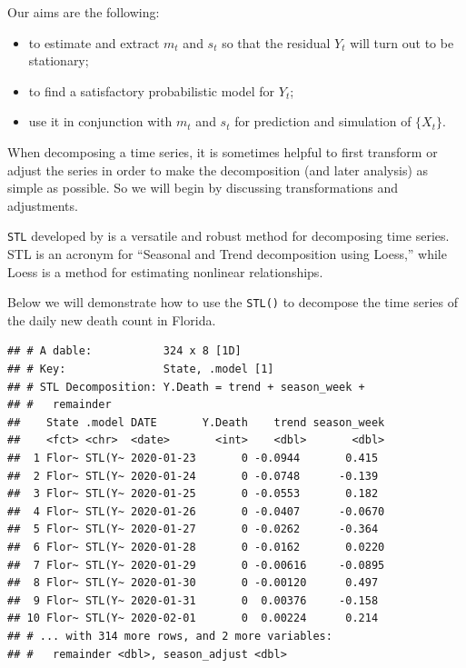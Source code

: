 \documentclass[]{book}
\newenvironment{Shaded}{\begin{snugshade}}{\end{snugshade}}
\newcommand{\KeywordTok}[1]{\textcolor[rgb]{0.13,0.29,0.53}{\textbf{#1}}}
\newcommand{\StringTok}[1]{\textcolor[rgb]{0.31,0.60,0.02}{#1}}
\newcommand{\CommentTok}[1]{\textcolor[rgb]{0.56,0.35,0.01}{\textit{#1}}}
\newcommand{\OperatorTok}[1]{\textcolor[rgb]{0.81,0.36,0.00}{\textbf{#1}}}
\newcommand{\NormalTok}[1]{#1}
\providecommand{\tightlist}{%
  \setlength{\itemsep}{0pt}\setlength{\parskip}{0pt}}
\begin{document}
Our aims are the following:

\begin{itemize}
\tightlist
\item
  to estimate and extract \(m_t\) and \(s_t\) so that the residual
  \(Y_t\) will turn out to be stationary;
\item
  to find a satisfactory probabilistic model for \(Y_t\);
\item
  use it in conjunction with \(m_t\) and \(s_t\) for prediction and
  simulation of \(\{X_t\}\).
\end{itemize}

When decomposing a time series, it is sometimes helpful to first
transform or adjust the series in order to make the decomposition (and
later analysis) as simple as possible. So we will begin by discussing
transformations and adjustments.

\texttt{STL} developed by \citet{Cleveland1990} is a versatile and
robust method for decomposing time series. STL is an acronym for
``Seasonal and Trend decomposition using Loess,'' while Loess is a
method for estimating nonlinear relationships.

Below we will demonstrate how to use the \texttt{STL()} to decompose the
time series of the daily new death count in Florida.

\begin{Shaded}
\end{Shaded}

\begin{verbatim}
## # A dable:           324 x 8 [1D]
## # Key:               State, .model [1]
## # STL Decomposition: Y.Death = trend + season_week +
## #   remainder
##    State .model DATE       Y.Death    trend season_week
##    <fct> <chr>  <date>       <int>    <dbl>       <dbl>
##  1 Flor~ STL(Y~ 2020-01-23       0 -0.0944       0.415 
##  2 Flor~ STL(Y~ 2020-01-24       0 -0.0748      -0.139 
##  3 Flor~ STL(Y~ 2020-01-25       0 -0.0553       0.182 
##  4 Flor~ STL(Y~ 2020-01-26       0 -0.0407      -0.0670
##  5 Flor~ STL(Y~ 2020-01-27       0 -0.0262      -0.364 
##  6 Flor~ STL(Y~ 2020-01-28       0 -0.0162       0.0220
##  7 Flor~ STL(Y~ 2020-01-29       0 -0.00616     -0.0895
##  8 Flor~ STL(Y~ 2020-01-30       0 -0.00120      0.497 
##  9 Flor~ STL(Y~ 2020-01-31       0  0.00376     -0.158 
## 10 Flor~ STL(Y~ 2020-02-01       0  0.00224      0.214 
## # ... with 314 more rows, and 2 more variables:
## #   remainder <dbl>, season_adjust <dbl>
\end{verbatim}
\end{document}
